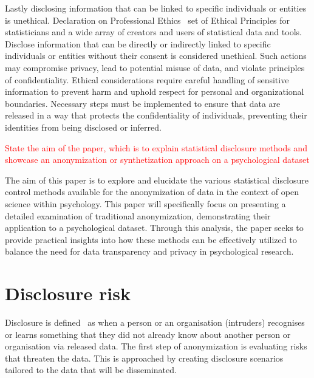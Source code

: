 \documentclass{article}
\begin{document}
Lastly disclosing information that can be linked to specific individuals or entities is unethical. Declaration on Professional Ethics~\cite{2010_ISI} set of Ethical Principles for statisticians and a wide array of creators and users of statistical data and tools. 
Disclose information that can be directly or indirectly linked to specific individuals or entities without their consent is considered unethical. Such actions may compromise privacy, lead to potential misuse of data, and violate principles of confidentiality. Ethical considerations require careful handling of sensitive information to prevent harm and uphold respect for personal and organizational boundaries. Necessary steps must be implemented to ensure that data are released in a way that protects the confidentiality of individuals, preventing their identities from being disclosed or inferred.
\newline

\textcolor{red}{State the aim of the paper, which is to explain statistical disclosure methods and showcase an anonymization or synthetization approach on a psychological dataset}

The aim of this paper is to explore and elucidate the various statistical disclosure control methods available for the anonymization of data in the context of open science within psychology. 
This paper will specifically focus on presenting a detailed examination of traditional anonymization, demonstrating their application to a psychological dataset. Through this analysis, the paper seeks to provide practical insights into how these methods can be effectively utilized to balance the need for data transparency and privacy in psychological research.

\section{Disclosure risk}

Disclosure is defined~\cite{2012_Hundepool} as when a person or an organisation (intruders) recognises or learns something that they did not already know about another person or organisation via released data.
The first step of anonymization is evaluating risks that threaten the data. This is approached by creating disclosure scenarios~\cite{2012_Hundepool} tailored to the data that will be disseminated. 
\end{document}

